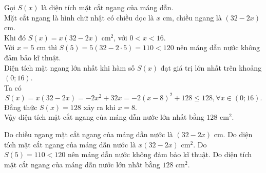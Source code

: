 \begin{ex}
	\loigiai
	{
		Gọi $S(x)$ là diện tích mặt cắt ngang của máng dẫn.\\
		Mặt cắt ngang là hình chữ nhật có chiều dọc là $x$ cm, chiều ngang là $(32-2x)$ cm.\\ Khi đó $S(x) = x(32-2x)$ cm$^2$, với $0<x<16$.\\
		Với $x=5$ cm thì $S(5) = 5(32-2\cdot 5) = 110<120$ nên máng dẫn nước không đảm bảo kĩ thuật.\\
		Diện tích mặt ngang lớn nhất khi hàm số $S(x)$ đạt giá trị lớn nhất trên khoảng $(0;16)$.\\
		Ta có
		\[S(x) = x(32-2x) = -2x^2+32x = -2(x-8)^2+128\leq 128, \forall x\in (0;16).\]
		Đẳng thức $S(x)=128$ xảy ra khi $x=8$.\\
		Vậy diện tích mặt cắt ngang của máng dẫn nước lớn nhất bằng $128$ cm$^2$.
		\begin{itemchoice}
			\itemch Do chiều ngang mặt cắt ngang của máng dẫn nước là $(32-2x)$ cm.
			\itemch Do diện tích mặt cắt ngang của máng dẫn nước là $x(32-2x)$ cm$^2$.
			\itemch Do $S(5) = 110<120$ nên máng dẫn nước không đảm bảo kĩ thuật.
			\itemch Do diện tích mặt cắt ngang của máng dẫn nước lớn nhất bằng $128$ cm$^2$.
		\end{itemchoice}
	}
\end{ex}

